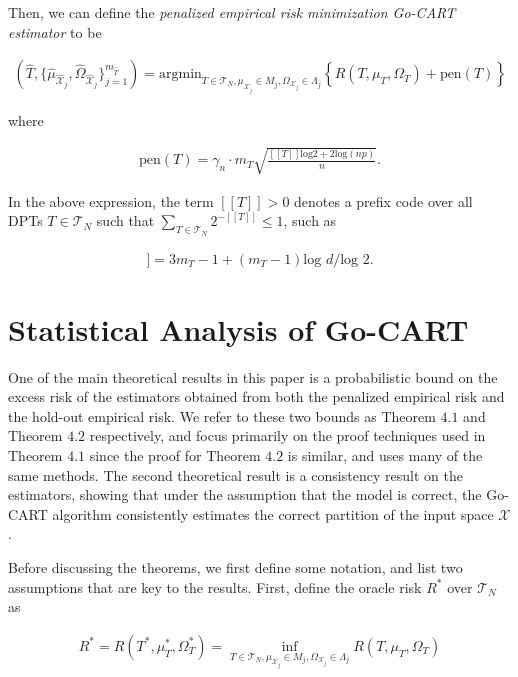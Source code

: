\documentclass[12pt]{article}
\begin{document}
Then, we can define the \emph{penalized empirical risk minimization
  Go-CART estimator} to be

\begin{align}
    \left( \hat{T}, \{ \hat{\mu}_{\hat{\mathcal{X}}_j}, \hat{\Omega}_{\hat{\mathcal{X}}_j} \}_{j=1}^{m_{\hat{T}}} \right) 
    = \text{argmin}_{T \in \mathcal{T}_N, \mu_{\mathcal{X}_j} \in M_j, \Omega_{\mathcal{X}_j} \in \Lambda_j} 
    \left\{ \hat{R}(T,\mu_T,\Omega_T) + \text{pen}(T) \right\}
\end{align}

where

\begin{align}
    \text{pen}(T) = \gamma_n \cdot m_T \sqrt{\frac{[[T]]\text{log}2 + 2\text{log}(np)}{n}}.
\end{align}

In the above expression, the term $[[T]] > 0$ denotes a prefix code
over all DPTs $T \in \mathcal{T}_N$ such that $\sum_{T\in
  \mathcal{T}_N} 2^{-[[T]]} \leq 1$, such as

\begin{align}
    [[T]] = 3 m_T - 1 + (m_T - 1)\text{log }d / \text{log }2.
\end{align}

\section{Statistical Analysis of Go-CART}

One of the main theoretical results in this paper is a probabilistic
bound on the excess risk of the estimators obtained from both the
penalized empirical risk and the hold-out empirical risk. We refer to
these two bounds as Theorem $4.1$ and Theorem $4.2$ respectively, and
focus primarily on the proof techniques used in Theorem $4.1$ since
the proof for Theorem $4.2$ is similar, and uses many of the same
methods. The second theoretical result is a consistency result on the
estimators, showing that under the assumption that the model is
correct, the Go-CART algorithm consistently estimates the correct
partition of the input space $\mathcal{X}$.

Before discussing the theorems, we first define some notation, and
list two assumptions that are key to the results. First, define the
oracle risk $R^*$ over $\mathcal{T}_N$ as

\begin{align}
  R^* = R(T^*, \mu_T^*, \Omega_T^*)
  = \inf_{T \in \mathcal{T}_N, \mu_{\mathcal{X}_j} \in M_j, \Omega_{\mathcal{X}_j} \in \Lambda_j}
  R(T, \mu_T, \Omega_T)
\end{align}
\end{document}
